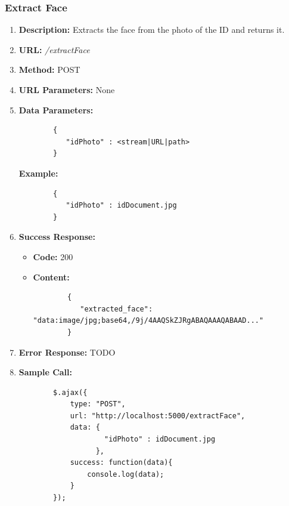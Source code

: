 \documentclass{article}
\begin{document}
        \subsubsection{Extract Face}
        \begin{enumerate}
        	\item \textbf{Description:} Extracts the face from the photo of the ID and returns it.
        	\item \textbf{URL:} \textit{/extractFace}
        	\item \textbf{Method:} POST
        	\item \textbf{URL Parameters:} None
        	\item \textbf{Data Parameters:}
        
        	\begin{lstlisting}
        {
           "idPhoto" : <stream|URL|path>
        }
        	\end{lstlisting}
        
        	\textbf{Example:}
        
        	\begin{lstlisting}
        {
           "idPhoto" : idDocument.jpg
        }
        	\end{lstlisting}
        	
        	\item \textbf{Success Response:} 
        		\begin{itemize}
        			\item \textbf{Code:} 200
        			\item \textbf{Content:}
        			\begin{lstlisting}
        {
           "extracted_face": "data:image/jpg;base64,/9j/4AAQSkZJRgABAQAAAQABAAD..."
        }
        			\end{lstlisting}
        		\end{itemize}
        		\item \textbf{Error Response:} TODO
        		\item \textbf{Sample Call:}
        		\begin{lstlisting}
        $.ajax({
            type: "POST",
            url: "http://localhost:5000/extractFace",
            data: {
                    "idPhoto" : idDocument.jpg
                  },
            success: function(data){
                console.log(data);
            }
        });
        		\end{lstlisting}
        \end{enumerate}
        
\end{document}
